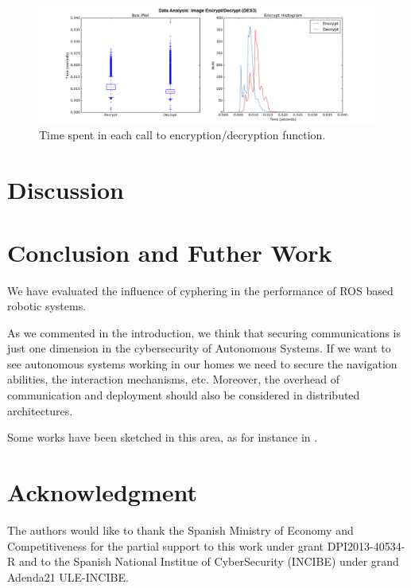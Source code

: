 \documentclass[journal,twoside]{JoPhA}
\begin{document}
\begin{figure}[ht!]
    \centering
    \includegraphics[width=.9\textwidth]{Outline_images_encryption_decrytiontime2.png}
    \caption{Time spent in each call to encryption/decryption function.}
  \label{fig:images_encryption}
\end{figure}


\section{Discussion}

% 
% 
% 
% 
% 





\section{Conclusion and Futher Work}

We have evaluated the influence of cyphering in the performance of ROS based robotic systems.

As we commented in the introduction, we think that securing communications is just one dimension in  the cybersecurity of Autonomous Systems. If we want to see autonomous systems working in our homes we need to secure the navigation abilities, the interaction mechanisms, etc. 
Moreover, the overhead of communication and deployment should also be considered in distributed architectures.

Some works have been sketched in this area, as for instance in \cite{Guiochet2016}.




\section*{Acknowledgment}
The authors would  like to thank the Spanish Ministry of Economy and Competitiveness for the partial support to this work under grant DPI2013-40534-R and to the Spanish National Institue of CyberSecurity (INCIBE) under grand Adenda21 ULE-INCIBE.

 

\end{document}
